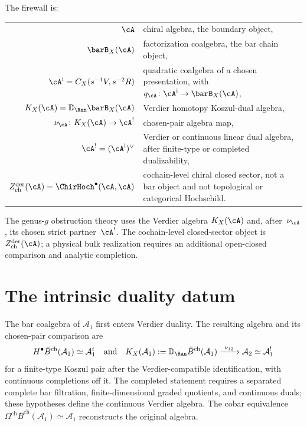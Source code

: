 The firewall is:
\begin{center}
\begin{tabular}{r@{\;:\quad}l}
$\cA$ & chiral algebra, the boundary object, \\
$\barB_X(\cA)$ & factorization coalgebra, the bar chain object, \\
$\cA^{\mathrm i}=C_X(s^{-1}V,s^{-2}R)$ & quadratic coalgebra of a chosen
 presentation, with $q_\cA\colon\cA^{\mathrm i}\to\barB_X(\cA)$, \\
$K_X(\cA)=\mathbb{D}_{\Ran}\barB_X(\cA)$ &
 Verdier homotopy Koszul-dual algebra, \\
$\nu_\cA\colon K_X(\cA)\to\cA^!$ & chosen-pair algebra map, \\
$\cA^! = (\cA^{\mathrm i})^\vee$ & Verdier or continuous linear dual algebra,
 after finite-type or completed dualizability, \\
$Z^{\mathrm{der}}_{\mathrm{ch}}(\cA)
 = \ChirHoch^\bullet(\cA,\cA)$ & cochain-level chiral closed sector, not a
 bar object and not topological or categorical Hochschild.
\end{tabular}
\end{center}
The genus-$g$ obstruction theory uses the Verdier algebra
$K_X(\cA)$ and, after~$\nu_\cA$, its chosen strict partner~$\cA^!$.
The cochain-level
closed-sector object is $Z^{\mathrm{der}}_{\mathrm{ch}}(\cA)$; a
physical bulk realization requires an additional open-closed comparison
and analytic completion.

\section{The intrinsic duality datum}

\begin{problem}\label{prob:independent-dual}
The bar coalgebra of $\mathcal{A}_1$ first enters Verdier duality.
The resulting algebra and its chosen-pair comparison are
\[
H^\bullet\bar{B}^{\mathrm{ch}}(\mathcal{A}_1)
\simeq \mathcal{A}_1^i
\quad\text{and}\quad
K_X(\mathcal A_1):=\mathbb{D}_{\Ran}
\bar{B}^{\mathrm{ch}}(\mathcal{A}_1)
\xrightarrow{\ \nu_{12}\ }\mathcal{A}_2\simeq\mathcal{A}_1^!
\]
for a finite-type Koszul pair after the Verdier-compatible
identification, with continuous completions off it.
The completed statement requires a separated complete
bar filtration, finite-dimensional graded quotients, and continuous
duals; these hypotheses define the continuous Verdier algebra.
The cobar equivalence
$\Omega^{\mathrm{ch}}\bar{B}^{\mathrm{ch}}(\mathcal{A}_1)
\simeq \mathcal{A}_1$
reconstructs the original algebra.
\end{problem}

